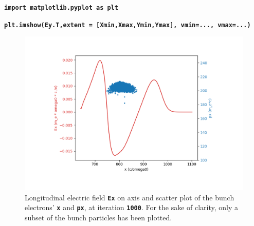 \documentclass[a4paper,12pt]{extarticle}
\newcommand{\commandline}[1]{\texttt{\textbf{#1}}}
\begin{document}
\commandline{import matplotlib.pyplot as plt}

\commandline{plt.imshow(Ey.T,extent = [Xmin,Xmax,Ymin,Ymax], vmin=..., vmax=...)}


\begin{figure}[!htb]
   \begin{minipage}{0.48\textwidth}
     \centering
     \includegraphics[width=1\linewidth]{ExScatterXPx.pdf}
     \caption{Longitudinal electric field \commandline{Ex} on axis and scatter plot of the bunch electrons' \commandline{x} and \commandline{px}, at iteration \commandline{1000}.  For the sake of clarity, only a subset of the bunch particles has been plotted.}\label{ExScatterXPx}
   \end{minipage}\hfill
   \begin{minipage}{0.48\textwidth}
     \centering

\end{minipage}
\end{figure}
\end{document}
